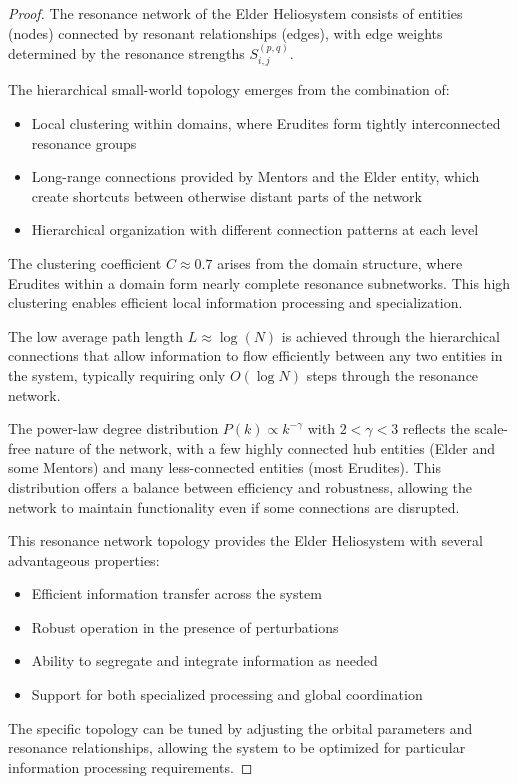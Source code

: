 \begin{proof}
The resonance network of the Elder Heliosystem consists of entities (nodes) connected by resonant relationships (edges), with edge weights determined by the resonance strengths $S_{i,j}^{(p,q)}$.

The hierarchical small-world topology emerges from the combination of:
\begin{itemize}
    \item Local clustering within domains, where Erudites form tightly interconnected resonance groups
    \item Long-range connections provided by Mentors and the Elder entity, which create shortcuts between otherwise distant parts of the network
    \item Hierarchical organization with different connection patterns at each level
\end{itemize}

The clustering coefficient $C \approx 0.7$ arises from the domain structure, where Erudites within a domain form nearly complete resonance subnetworks. This high clustering enables efficient local information processing and specialization.

The low average path length $L \approx \log(N)$ is achieved through the hierarchical connections that allow information to flow efficiently between any two entities in the system, typically requiring only $O(\log N)$ steps through the resonance network.

The power-law degree distribution $P(k) \propto k^{-\gamma}$ with $2 < \gamma < 3$ reflects the scale-free nature of the network, with a few highly connected hub entities (Elder and some Mentors) and many less-connected entities (most Erudites). This distribution offers a balance between efficiency and robustness, allowing the network to maintain functionality even if some connections are disrupted.

This resonance network topology provides the Elder Heliosystem with several advantageous properties:
\begin{itemize}
    \item Efficient information transfer across the system
    \item Robust operation in the presence of perturbations
    \item Ability to segregate and integrate information as needed
    \item Support for both specialized processing and global coordination
\end{itemize}

The specific topology can be tuned by adjusting the orbital parameters and resonance relationships, allowing the system to be optimized for particular information processing requirements.
\end{proof}

